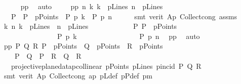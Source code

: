 \begin{isabellebody}
\ \ \ \ \isamarkupfalse%
\ pp{}\ \isamarkupfalse%
\ auto\ \isanewline
\isanewline
\ \ \isamarkupfalse%
\ pp{}{\isacharcolon}{\kern0pt}\ {\isachardoublequoteopen}{\isasymAnd}n\ k\ {\isachardot}{\kern0pt}{\isasymlbrakk}k\ {\isasymin}\ pLines{\isacharsemicolon}{\kern0pt}\ n\ {\isasymin}\ pLines{\isasymrbrakk}\ {\isasymLongrightarrow}\ \isanewline
\ \ {\isasymexists}\ P\ {\isachardot}{\kern0pt}\ {\isacharparenleft}{\kern0pt}P\ {\isasymin}\ pPoints\ {\isasymand}\ P\ p{\isasymlhd}\ k\ {\isasymand}\ P\ p{\isasymlhd}\ n{\isacharparenright}{\kern0pt}{\isachardoublequoteclose}\isanewline
\ \ \ \ \isamarkupfalse%
\ {\isacharparenleft}{\kern0pt}smt\ {\isacharparenleft}{\kern0pt}verit{\isacharparenright}{\kern0pt}\ Ap{}\ Collect{\isacharunderscore}{\kern0pt}cong\ assms{\isacharparenright}{\kern0pt}\isanewline
\isanewline
\ \ \isamarkupfalse%
\ {\isachardoublequoteopen}{\isasymAnd}k\ n{\isachardot}{\kern0pt}\ k\ {\isasymin}\ pLines\ {\isasymLongrightarrow}\ n\ {\isasymin}\ pLines\ {\isasymLongrightarrow}\isanewline
\ \ \ \ \ \ \ \ \ \ \ {\isasymexists}P{\isachardot}{\kern0pt}\ P\ {\isasymin}\ pPoints\ {\isasymand}\isanewline
\ \ \ \ \ \ \ \ \ \ \ \ \ \ \ \ P\ p{\isasymlhd}\ k\ {\isasymand}\isanewline
\ \ \ \ \ \ \ \ \ \ \ \ \ \ \ \ P\ p{\isasymlhd}\ n{\isachardoublequoteclose}\ \isamarkupfalse%
\ pp{}\ \isamarkupfalse%
\ auto\isanewline
\isanewline
\ \ \isamarkupfalse%
\ pp{}{\isacharcolon}{\kern0pt}\ {\isachardoublequoteopen}{\isasymexists}P\ Q\ R{\isachardot}{\kern0pt}\ P\ {\isasymin}\ pPoints\ {\isasymand}\ Q\ {\isasymin}\ pPoints\ {\isasymand}\ R\ {\isasymin}\ pPoints\ {\isasymand}\isanewline
\ \ \ \ P\ {\isasymnoteq}\ Q\ {\isasymand}\ P\ {\isasymnoteq}\ R\ {\isasymand}\ Q\ {\isasymnoteq}\ R\ {\isasymand}\ \isanewline
\ \ {\isasymnot}\ {\isacharparenleft}{\kern0pt}projective{\isacharunderscore}{\kern0pt}plane{\isacharunderscore}{\kern0pt}data{}{\isachardot}{\kern0pt}pcollinear\ pPoints\ pLines\ {\isacharparenleft}{\kern0pt}pincid{\isacharparenright}{\kern0pt}\ P\ Q\ R{\isacharparenright}{\kern0pt}{\isachardoublequoteclose}\isanewline
\ \ \ \ \isamarkupfalse%
\ {\isacharparenleft}{\kern0pt}smt\ {\isacharparenleft}{\kern0pt}verit{\isacharparenright}{\kern0pt}\ Ap{}\ Collect{\isacharunderscore}{\kern0pt}cong\ ap\ pLdef\ pPdef\ pm{\isacharparenright}{\kern0pt}\isanewline
\ \ \isamarkupfalse%

\end{isabellebody}
